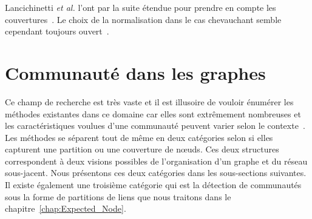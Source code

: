 Lancichinetti \emph{et al.} l'ont par la suite étendue pour prendre en compte les couvertures~\cite{Lancichinetti2009d}.
Le choix de la normalisation dans le cas chevauchant semble cependant toujours ouvert~\cite{McDaid2011,Zhang2015c}.



\section{Communauté dans les graphes}
\label{sec:intro_communaute}

Ce champ de recherche est très vaste et il est illusoire de vouloir énumérer les méthodes existantes dans ce domaine car elles sont extrêmement nombreuses et les caractéristiques voulues d'une communauté peuvent varier selon le contexte~\cite{Leskovec2008,Coscia2011,Yang2015,Jeub2015}.
Les méthodes se séparent tout de même en deux catégories selon si elles capturent une partition ou une couverture de n\oe uds.
Ces deux structures correspondent à deux visions possibles de l'organisation d'un graphe et du réseau sous-jacent.
Nous présentons ces deux catégories dans les sous-sections suivantes.
Il existe également une troisième catégorie qui est la détection de communautés sous la forme de partitions de liens que nous traitons dans le chapitre~\ref{chap:Expected_Node}.

